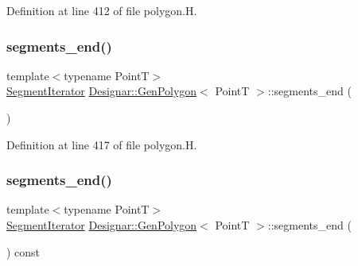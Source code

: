 Definition at line 412 of file polygon.\+H.

\mbox{\label{class_designar_1_1_gen_polygon_a1812e03e19df8a1363989b271955ea66}} 
\subsubsection{\texorpdfstring{segments\+\_\+end()}{segments\_end()}\hspace{0.1cm}{\footnotesize\ttfamily [1/2]}}
{\footnotesize\ttfamily template$<$typename PointT$>$ \\
\hyperlink{class_designar_1_1_gen_polygon_1_1_segment_iterator}{Segment\+Iterator} \hyperlink{class_designar_1_1_gen_polygon}{Designar\+::\+Gen\+Polygon}$<$ PointT $>$\+::segments\+\_\+end (\begin{DoxyParamCaption}{ }\end{DoxyParamCaption})\hspace{0.3cm}{\ttfamily [inline]}}



Definition at line 417 of file polygon.\+H.

\mbox{\label{class_designar_1_1_gen_polygon_aa8e70075cae9a4a726bc8635d2cd527b}} 
\subsubsection{\texorpdfstring{segments\+\_\+end()}{segments\_end()}\hspace{0.1cm}{\footnotesize\ttfamily [2/2]}}
{\footnotesize\ttfamily template$<$typename PointT$>$ \\
\hyperlink{class_designar_1_1_gen_polygon_1_1_segment_iterator}{Segment\+Iterator} \hyperlink{class_designar_1_1_gen_polygon}{Designar\+::\+Gen\+Polygon}$<$ PointT $>$\+::segments\+\_\+end (\begin{DoxyParamCaption}{ }\end{DoxyParamCaption}) const\hspace{0.3cm}{\ttfamily [inline]}}



